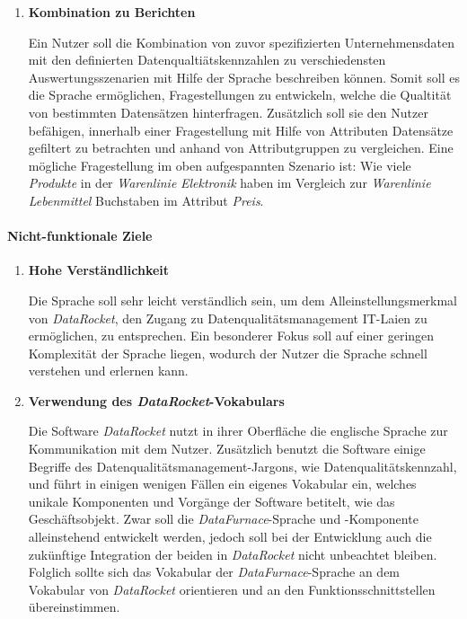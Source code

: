 \documentclass[
  language=german, %
  type=bachelor,%
  ngerman
]{isthesis}
\begin{document}
\begin{content}
\begin{enumerate}
      \item \textbf{Kombination zu Berichten}

        Ein Nutzer soll die Kombination von zuvor spezifizierten
        Unternehmensdaten mit den definierten Datenqualtiätskennzahlen zu
        verschiedensten Auswertungsszenarien mit Hilfe der Sprache beschreiben
        können. Somit soll es die Sprache ermöglichen, Fragestellungen zu
        entwickeln, welche die Qualtität von bestimmten Datensätzen hinterfragen.
        Zusätzlich soll sie den Nutzer befähigen, innerhalb einer
        Fragestellung mit Hilfe von Attributen Datensätze gefiltert zu
        betrachten und anhand von Attributgruppen zu vergleichen. Eine mögliche
        Fragestellung im oben aufgespannten Szenario ist: Wie viele
        \textit{Produkte} in der \textit{Warenlinie} \textit{Elektronik} haben
        im Vergleich zur \textit{Warenlinie} \textit{Lebenmittel} Buchstaben im
        Attribut \textit{Preis}.
    \end{enumerate}

  \paragraph{Nicht-funktionale Ziele}
    \begin{enumerate}
      \item \textbf{Hohe Verständlichkeit}\label{item:hohe-verstaendlichkeit}

				Die Sprache soll sehr leicht verständlich sein, um dem
				Alleinstellungsmerkmal von \textit{DataRocket}, den Zugang zu
				Datenqualitätsmanagement IT-Laien zu ermöglichen, zu entsprechen.
				Ein besonderer Fokus soll auf einer geringen Komplexität der Sprache
				liegen, wodurch der Nutzer die Sprache schnell verstehen und erlernen
				kann.

      \item \textbf{Verwendung des \textit{DataRocket}-Vokabulars}

				Die Software \textit{DataRocket} nutzt in ihrer Oberfläche die
				englische Sprache zur Kommunikation mit dem Nutzer. Zusätzlich benutzt
				die Software einige Begriffe des Datenqualitätsmanagement-Jargons, wie
				\zB{} Datenqualitätskennzahl, und führt in einigen wenigen Fällen ein
				eigenes Vokabular ein, welches unikale Komponenten und Vorgänge der
				Software betitelt, wie \zB{} das Geschäftsobjekt. Zwar soll die
				\textit{DataFurnace}-Sprache und -Komponente alleinstehend entwickelt
				werden, jedoch soll bei der Entwicklung auch die zukünftige Integration
				der beiden in \textit{DataRocket} nicht unbeachtet bleiben. Folglich
				sollte sich das Vokabular der \textit{DataFurnace}-Sprache an dem
				Vokabular von \textit{DataRocket} orientieren und an den
				Funktionsschnittstellen übereinstimmen.


\end{enumerate}
\end{content}
\end{document}
